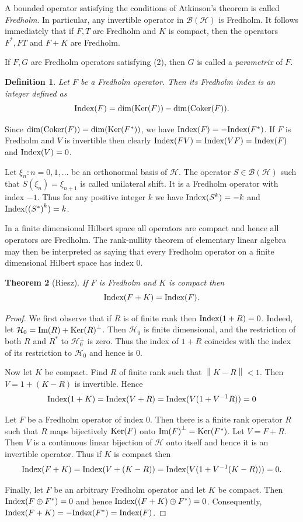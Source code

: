 \documentclass{book}
\newtheorem{definition}{Definition}[section]
\newtheorem{theorem}[definition]{Theorem}
\def\Index{\textnormal{Index}}
\begin{document}
A bounded operator satisfying the conditions of Atkinson's theorem is called \textit{Fredholm}.
In particular, any invertible operator in \(\mathcal{B}(\mathcal{H})\) is Fredholm.
It follows immediately that if \(F,T\) are Fredholm and \(K\) is compact, then the operators \(F^*, FT\) and \(F+K\)
are Fredholm.\par
If \(F,G\) are Fredholm operators satisfying (2), then \(G\) is called a \textit{parametrix} of \(F\).
\begin{definition}
  Let \(F\) be a Fredholm operator. Then its \textit{Fredholm index} is an integer defined as
  \[
    \textnormal{Index}(F)=\dim(\textnormal{Ker}(F))-\dim(\textnormal{Coker}(F)).
  \]
\end{definition}
Since \(\dim(\textnormal{Coker}(F)) = \dim(\textnormal{Ker}(F^*))\), we have \(\Index(F) = -\Index(F^*)\). If \(F\) is
Fredholm and \(V\) is invertible then clearly \(\Index(FV) = \Index(VF) = \Index(F)\) and
\(\Index(V ) = 0\).\par
Let \({\xi_n : n = 0,1,\ldots}\) be an orthonormal basis of \(\mathcal{H}\). The operator \(S \in \mathcal{B}(\mathcal{H})\) such
that \(S(\xi_n) = \xi_{n+1}\) is called unilateral shift. It is a Fredholm operator with index \(-1\). Thus
for any positive integer \(k\) we have \(\Index(S^k) = -k\) and \(\Index({(S^*)}^k) = k\).\par
In a finite dimensional Hilbert space all operators are compact and hence all operators
are Fredholm. The rank-nullity theorem of elementary linear algebra may then be
interpreted as saying that every Fredholm operator on a finite dimensional Hilbert space
has index \(0\).
\begin{theorem}[Riesz]
  If \(F\) is Fredholm and \(K\) is compact then
  \[
    \Index(F+K)=\Index(F).
  \]
\end{theorem}
\begin{proof}
  We first observe that if \(R\) is of finite rank then \(\Index(1+R)=0\). Indeed, let
  \(\mathcal{H}_0=\textnormal{Im}(R)+{\textnormal{Ker}(R)}^\perp\). Then \(\mathcal{H}_0\) is finite dimensional, and the restriction of both \(R\) and \(R^*\)
  to \(\mathcal{H}_0^\perp\) is zero. Thus the index of \(1+R\) coincides with the index of its restriction to \(\mathcal{H}_0\) and hence is \(0\).\par
  Now let \(K\) be compact. Find \(R\) of finite rank such that \(\left\|K-R\right\|<1\). Then \(V=1+(K-R)\) is invertible. Hence
  \[
    \Index(1+K)=\Index(V+R)=\Index(V(1+V^{-1}R))=0
  \]\par
  Let \(F\) be a Fredholm operator of index \(0\). Then there is a finite rank operator \(R\) such that
  \(R\) maps bijectively \(\textnormal{Ker}(F)\) onto \({\textnormal{Im}(F)}^\perp=\textnormal{Ker}(F^*)\).
  Let \(V=F+R\). Then \(V\) is a continuous linear bijection of \(\mathcal{H}\) onto itself and hence it is an invertible operator. Thus if \(K\) is compact then
  \[
    \Index(F+K)=\Index(V+(K-R))=\Index(V(1+V^{-1}(K-R)))=0.
  \]\par
  Finally, let \(F\) be an arbitrary Fredholm operator and let \(K\) be compact. Then \(\Index(F\oplus F^*)=0\) and hence
  \(\Index((F+K)\oplus F^*)=0\). Consequently, \(\Index(F+K)=-\Index(F^*)=\Index(F)\).
\end{proof}
\end{document}
